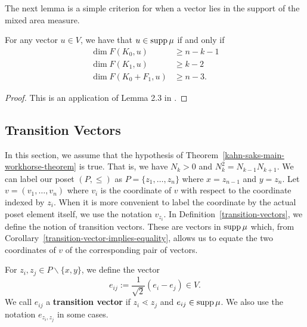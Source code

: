 \documentclass{puthesis-UG}
\begin{document}
The next lemma is a simple criterion for when a vector lies in the support of the mixed area measure. 

\begin{lem} \label{kahn-saks-conditions-for-being-in-support-area-measure-lemma}
	For any vector $u \in V$, we have that $u \in \operatorname{supp} \mu$ if and only if 
	\begin{align*}
		\dim F(K_0, u) & \geq n-k-1 \\
		\dim F(K_1, u) & \geq k-2 \\
		\dim F(K_0 + F_1, u) & \geq n-3.
	\end{align*}
\end{lem}

\begin{proof}
	This is an application of Lemma 2.3 in \cite{shenfeld2022extremals}.
\end{proof}

\subsection{Transition Vectors}

In this section, we assume that the hypothesis of Theorem~\ref{kahn-saks-main-workhorse-theorem} is true. That is, we have $N_k > 0$ and $N_k^2 = N_{k-1} N_{k+1}$. We can label our poset $(P, \leq)$ as $P = \{z_1, \ldots, z_n\}$ where $x = z_{n-1}$ and $y = z_n$. Let $v = (v_1, \ldots, v_n)$ where $v_i$ is the coordinate of $v$ with respect to the coordinate indexed by $z_i$. When it is more convenient to label the coordinate by the actual poset element itself, we use the notation $v_{z_i}$. In Definition~\ref{transition-vectors}, we define the notion of transition vectors. These are vectors in $\operatorname{supp} \mu$ which, from Corollary~\ref{transition-vector-implies-equality}, allows us to equate the two coordinates of $v$ of the corresponding pair of vectors.

\begin{defn} \label{transition-vectors}
	For $z_i, z_j \in P \backslash \{x, y\}$, we define the vector 
	\[
		e_{ij} := \frac{1}{\sqrt{2}} (e_i - e_j) \in V.
	\]
	We call $e_{ij}$ a \textbf{transition vector} if $z_i \lessdot z_j$ and $e_{ij} \in \operatorname{supp} \mu$. We also use the notation $e_{z_i, z_j}$ in some cases. 
\end{defn}
\end{document}
